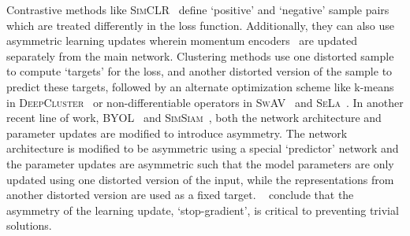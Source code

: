 \documentclass{article}
\begin{document}
Contrastive methods like \textsc{SimCLR}~\cite{chen2020simple} define `positive' and `negative' sample pairs which are treated differently in the loss function.
Additionally, they can also use asymmetric learning updates wherein momentum encoders~\cite{he2019momentum} are updated separately from the main network. 
Clustering methods use one distorted sample to compute `targets' for the loss, and another distorted version of the sample to predict these targets, followed by an alternate optimization scheme like k-means in \textsc{DeepCluster}~\cite{caron2018deep} or non-differentiable operators in \textsc{SwAV}~\cite{caron2020swav} and \textsc{SeLa}~\cite{asano2019self}.
In another recent line of work, \textsc{BYOL}~\cite{grill2020bootstrap} and \textsc{SimSiam}~\cite{chen2020exploring}, both the network architecture and parameter updates are modified to introduce asymmetry. The network architecture is modified to be asymmetric using a special `predictor' network and the parameter updates are asymmetric such that the model parameters are only updated using one distorted version of the input, while the representations from another distorted version are used as a fixed target.
~\cite{chen2020exploring} conclude that the asymmetry of the learning update, `stop-gradient', is critical to preventing trivial solutions.
\end{document}
